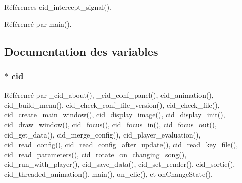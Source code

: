 Références cid\_\-intercept\_\-signal().

Référencé par main().

\subsection{Documentation des variables}
\subsubsection{$\ast$ {\bf cid}}\label{cid_8h_840f0e53011817c3b2f82f5c39cc9379}




Référencé par \_\-cid\_\-about(), \_\-cid\_\-conf\_\-panel(), cid\_\-animation(), cid\_\-build\_\-menu(), cid\_\-check\_\-conf\_\-file\_\-version(), cid\_\-check\_\-file(), cid\_\-create\_\-main\_\-window(), cid\_\-display\_\-image(), cid\_\-display\_\-init(), cid\_\-draw\_\-window(), cid\_\-focus(), cid\_\-focus\_\-in(), cid\_\-focus\_\-out(), cid\_\-get\_\-data(), cid\_\-merge\_\-config(), cid\_\-player\_\-evaluation(), cid\_\-read\_\-config(), cid\_\-read\_\-config\_\-after\_\-update(), cid\_\-read\_\-key\_\-file(), cid\_\-read\_\-parameters(), cid\_\-rotate\_\-on\_\-changing\_\-song(), cid\_\-run\_\-with\_\-player(), cid\_\-save\_\-data(), cid\_\-set\_\-render(), cid\_\-sortie(), cid\_\-threaded\_\-animation(), main(), on\_\-clic(), et onChangeState().